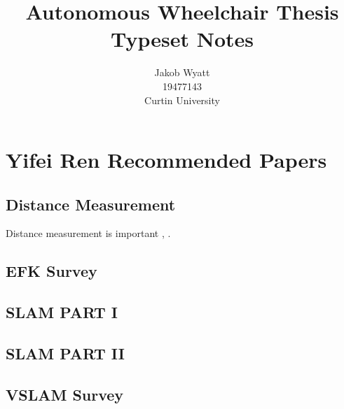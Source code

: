 \documentclass{article}
\title{Autonomous Wheelchair Thesis\\Typeset Notes}
\author{Jakob Wyatt\\19477143\\Curtin University}
\begin{document}
\maketitle
\pagebreak
\section{Yifei Ren Recommended Papers}
\subsection{Distance Measurement}
Distance measurement is important \cite{tomari_enhancing_2014}, \cite{distance_measurement}.

\subsection{EFK Survey}
\subsection{SLAM PART I}
\subsection{SLAM PART II}
\subsection{VSLAM Survey}

\pagebreak
\printbibliography
\end{document}
